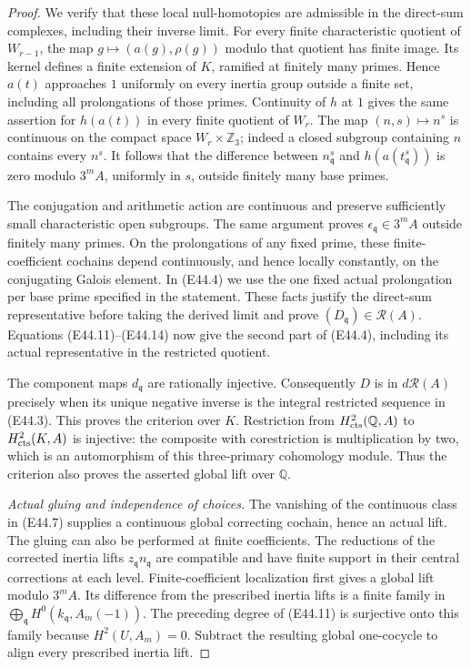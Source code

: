 \begin{proof}
We verify that these local null-homotopies
are admissible in the direct-sum complexes,
including their inverse limit. For every
finite characteristic quotient of
$W_{r-1}$, the map
$g\mapsto(a(g),\rho(g))$ modulo that
quotient has finite image. Its kernel
defines a finite extension of $K$,
ramified at finitely many primes.
Hence $a(t)$ approaches $1$ uniformly
on every inertia group outside a finite
set, including all prolongations of those
primes. Continuity of $h$ at $1$ gives
the same assertion for $h(a(t))$ in
every finite quotient of $W_r$.
The map $(n,s)\mapsto n^s$ is continuous
on the compact space $W_r\times\mathbb Z_3$;
indeed a closed subgroup containing $n$
contains every $n^s$.
It follows that the difference between
$n_{\mathfrak q}^s$ and
$h(a(t_{\mathfrak q}^s))$ is zero
modulo $3^mA$, uniformly in $s$, outside
finitely many base primes.

The conjugation and arithmetic action
are continuous and preserve sufficiently
small characteristic open subgroups.
The same argument proves
$\epsilon_{\mathfrak q}\in3^mA$
outside finitely many primes. On the
prolongations of any fixed prime, these
finite-coefficient cochains depend
continuously, and hence locally
constantly, on the conjugating Galois
element. In (E44.4) we use the one
fixed actual prolongation per base
prime specified in the statement.
These facts justify the direct-sum
representative before taking the
derived limit and prove
$(D_{\mathfrak q})\in\mathcal R(A)$.
Equations (E44.11)--(E44.14) now give
the second part of (E44.4), including
its actual representative in the
restricted quotient.

The component maps $d_{\mathfrak q}$
are rationally injective. Consequently
$D$ is in $d\mathcal R(A)$ precisely
when its unique negative inverse is
the integral restricted sequence in
(E44.3). This proves the criterion
over $K$. Restriction from
$H^2_{\rm cts}(\mathbb Q,A)$ to
$H^2_{\rm cts}(K,A)$ is injective:
the composite with corestriction is
multiplication by two, which is an
automorphism of this three-primary
cohomology module. Thus the criterion
also proves the asserted global lift
over $\mathbb Q$.

\emph{Actual gluing and independence of choices.}
The vanishing of the continuous class
in (E44.7) supplies a continuous
global correcting cochain, hence an
actual lift. The gluing can also be
performed at finite coefficients.
The reductions of the corrected
inertia lifts
$z_{\mathfrak q}n_{\mathfrak q}$
are compatible and have finite support
in their central corrections at each
level. Finite-coefficient localization
first gives a global lift modulo
$3^mA$. Its difference from the
prescribed inertia lifts is a finite
family in
$\bigoplus_{\mathfrak q}H^0(k_{\mathfrak q},A_m(-1))$.
The preceding degree of (E44.11) is
surjective onto this family because
$H^2(U,A_m)=0$. Subtract the resulting
global one-cocycle to align every
prescribed inertia lift.


\end{proof}
